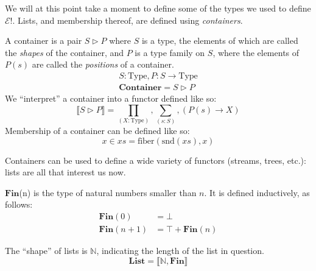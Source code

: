 We will at this point take a moment to define some of the types we used to
define \(\mathcal{E}!\).
Lists, and membership thereof, are defined using \emph{containers}.
\begin{rm-definition}[Container] \label{container-def}
  A container \cite{abbottContainersConstructingStrictly2005} is a pair
  \(S \triangleright P\) where \(S\) is a type, the elements of which are called
  the \emph{shapes} of the container, and \(P\) is a type family on \(S\), where
  the elements of \(P(s)\) are called the \emph{positions} of a container.
  \begin{equation}
    \begin{aligned}
      S : \text{Type}, P : S \rightarrow \text{Type} \\
      \mathbf{Container} = S \triangleright P
    \end{aligned}
  \end{equation}
  We ``interpret'' a container into a functor defined like so:
  \begin{equation}
    \llbracket S \triangleright P \rrbracket = \prod_{(X : \text{Type})} , \sum_{(s : S)} , \left( P(s) \rightarrow X \right)
  \end{equation}
  Membership of a container can be defined like so:
  \begin{equation}
    x \in \mathit{xs} = \text{fiber}(\text{snd}(\mathit{xs}), x)
  \end{equation}
\end{rm-definition}
Containers can be used to define a wide variety of functors (streams, trees,
etc.): lists are all that interest us now.
\begin{rm-definition}
  \(\mathbf{Fin}\)(n) is the type of natural numbers smaller than \(n\).
  It is defined inductively, as follows:
  \begin{equation}
    \begin{aligned}
      \mathbf{Fin}(0) &= \bot \\
      \mathbf{Fin}(n + 1) &= \top + \mathbf{Fin}(n)
    \end{aligned}
  \end{equation}
\end{rm-definition}
\begin{rm-definition}[Lists]
  The ``shape'' of lists is \(\mathbb{N}\), indicating the length of the list in
  question.
  \begin{equation}
    \mathbf{List} = \llbracket \mathbb{N} , \mathbf{Fin} \rrbracket
  \end{equation}
\end{rm-definition}

